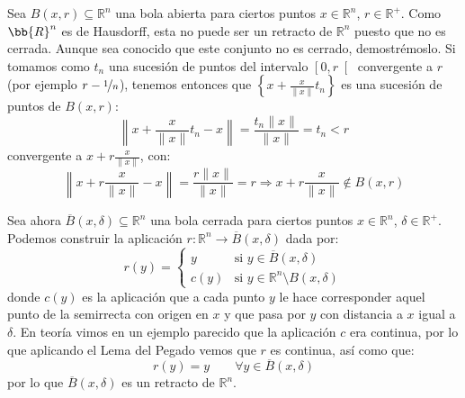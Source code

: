 \begin{ejercicio}
    \noindent
    Sea $B(x,r)\subseteq \mathbb{R}^n$ una bola abierta para ciertos puntos $x\in \mathbb{R}^n$, $r\in \mathbb{R}^+$. Como $\bb{R}^n$ es de Hausdorff, esta no puede ser un retracto de $\mathbb{R}^n$ puesto que no es cerrada. Aunque sea conocido que este conjunto no es cerrado, demostrémoslo. Si tomamos como $t_n$ una sucesión de puntos del intervalo $\left[0,r\right[$ convergente a $r$ (por ejemplo $r-\nicefrac{1}{n}$), tenemos entonces que $\left\{x+\frac{x}{\|x\|}t_n\right\}$ es una sucesión de puntos de $B(x,r)$:
        \begin{equation*}
            \left\|x+\frac{x}{\|x\|}t_n - x\right\| = \frac{t_n\|x\|}{\|x\|} = t_n < r
        \end{equation*}
        convergente a $x+r\frac{x}{\|x\|}$, con:
        \begin{equation*}
            \left\|x+r\frac{x}{\|x\|}-x\right\| = \frac{r\|x\|}{\|x\|} = r \Longrightarrow x+r\frac{x}{\|x\|}\notin B(x,r)
        \end{equation*}

    \noindent
    Sea ahora $\overline{B}(x,\delta)\subseteq \mathbb{R}^n$  una bola cerrada para ciertos puntos $x\in \mathbb{R}^n$, $\delta\in \mathbb{R}^+$. Podemos construir la aplicación $r:\mathbb{R}^n\to \overline{B}(x,\delta)$ dada por:
    \begin{equation*}
        r(y) = \left\{\begin{array}{ll}
            y & \text{si\ } y\in \overline{B}(x,\delta) \\
            c(y) & \text{si\ } y\in \mathbb{R}^n\setminus B(x,\delta)
        \end{array}\right. 
    \end{equation*}
    donde $c(y)$ es la aplicación que a cada punto $y$ le hace corresponder aquel punto de la semirrecta con origen en $x$ y que pasa por $y$ con distancia a $x$ igual a $\delta$. En teoría vimos en un ejemplo parecido que la aplicación $c$ era continua, por lo que aplicando el Lema del Pegado vemos que $r$ es continua, así como que:
    \begin{equation*}
        r(y) = y \qquad \forall y\in \overline{B}(x,\delta)
    \end{equation*}
    por lo que $\overline{B}(x,\delta)$ es un retracto de $\mathbb{R}^n$.
\end{ejercicio}

